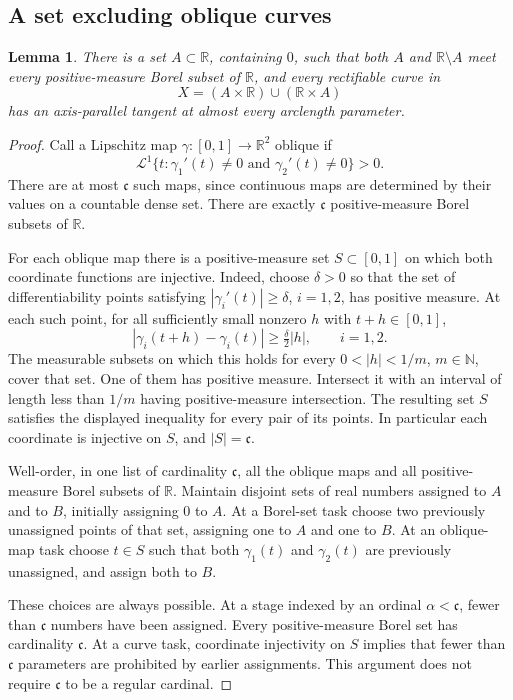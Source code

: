 \documentclass[11pt,a4paper]{article}
\newtheorem{lemma}[theorem]{Lemma}
\theoremstyle{remark}
\begin{document}
\subsection{A set excluding oblique curves}

\begin{lemma}
There is a set $A\subset\mathbb R$, containing $0$, such that both $A$ and
$\mathbb R\setminus A$ meet every positive-measure Borel subset of
$\mathbb R$, and every rectifiable curve in
\[
 X=(A\times\mathbb R)\cup(\mathbb R\times A)
\]
has an axis-parallel tangent at almost every arclength parameter.
\end{lemma}

\begin{proof}
Call a Lipschitz map $\gamma:[0,1]\to\mathbb R^2$ oblique if
\[
 \mathcal L^1\{t:\gamma_1'(t)\ne0\text{ and }\gamma_2'(t)\ne0\}>0.
\]
There are at most $\mathfrak c$ such maps, since continuous maps are
determined by their values on a countable dense set.  There are exactly
$\mathfrak c$ positive-measure Borel subsets of $\mathbb R$.

For each oblique map there is a positive-measure set $S\subset[0,1]$ on
which both coordinate functions are injective.  Indeed, choose $\delta>0$
so that the set of differentiability points satisfying
$|\gamma_i'(t)|\ge\delta$, $i=1,2$, has positive measure.  At each such
point, for all sufficiently small nonzero $h$ with $t+h\in[0,1]$,
\[
 |\gamma_i(t+h)-\gamma_i(t)|\ge\tfrac{\delta}{2}|h|,
 \qquad i=1,2.
\]
The measurable subsets on which this holds for every $0<|h|<1/m$,
$m\in\mathbb N$, cover that set.  One of them has positive measure.
Intersect it with an interval of length less than $1/m$ having
positive-measure intersection.  The resulting set $S$ satisfies the
displayed inequality for every pair of its points.  In particular each
coordinate is injective on $S$, and $|S|=\mathfrak c$.

Well-order, in one list of cardinality $\mathfrak c$, all the oblique maps
and all positive-measure Borel subsets of $\mathbb R$.  Maintain disjoint
sets of real numbers assigned to $A$ and to $B$, initially assigning $0$
to $A$.  At a Borel-set task choose two previously unassigned points of
that set, assigning one to $A$ and one to $B$.  At an oblique-map task
choose $t\in S$ such that both $\gamma_1(t)$ and $\gamma_2(t)$ are
previously unassigned, and assign both to $B$.

These choices are always possible.  At a stage indexed by an ordinal
$\alpha<\mathfrak c$, fewer than $\mathfrak c$ numbers have been assigned.
Every positive-measure Borel set has cardinality $\mathfrak c$.  At a
curve task, coordinate injectivity on $S$ implies that fewer than
$\mathfrak c$ parameters are prohibited by earlier assignments.  This
argument does not require $\mathfrak c$ to be a regular cardinal.


\end{proof}
\end{document}
